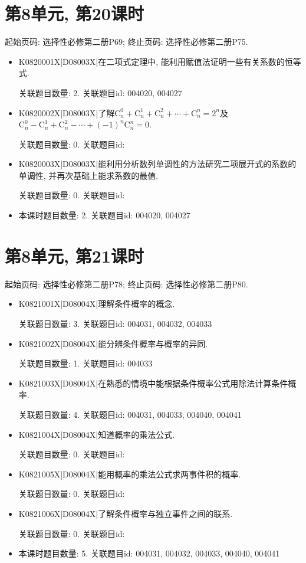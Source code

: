 \section*{第8单元, 第20课时}
起始页码: 选择性必修第二册P69; 终止页码: 选择性必修第二册P75.
\begin{itemize}
\item K0820001X|D08003X|在二项式定理中, 能利用赋值法证明一些有关系数的恒等式.

关联题目数量: 2. 关联题目id: 004020, 004027

\item K0820002X|D08003X|了解$\mathrm{C}_n^0+\mathrm{C}_n^1+\mathrm{C}_n^2+\cdots+\mathrm{C}_n^n=2^n$及$\mathrm{C}_n^0-\mathrm{C}_n^1+\mathrm{C}_n^2-\cdots+(-1)^n\mathrm{C}_n^n=0$.

关联题目数量: 0. 关联题目id: 

\item K0820003X|D08003X|能利用分析数列单调性的方法研究二项展开式的系数的单调性, 并再次基础上能求系数的最值.

关联题目数量: 0. 关联题目id: 

\item 本课时题目数量: 2. 关联题目id: 004020, 004027

\end{itemize}

\section*{第8单元, 第21课时}
起始页码: 选择性必修第二册P78; 终止页码: 选择性必修第二册P80.
\begin{itemize}
\item K0821001X|D08004X|理解条件概率的概念.

关联题目数量: 3. 关联题目id: 004031, 004032, 004033

\item K0821002X|D08004X|能分辨条件概率与概率的异同.

关联题目数量: 1. 关联题目id: 004033

\item K0821003X|D08004X|在熟悉的情境中能根据条件概率公式用除法计算条件概率.

关联题目数量: 4. 关联题目id: 004031, 004033, 004040, 004041

\item K0821004X|D08004X|知道概率的乘法公式.

关联题目数量: 0. 关联题目id: 

\item K0821005X|D08004X|能用概率的乘法公式求两事件积的概率.

关联题目数量: 0. 关联题目id: 

\item K0821006X|D08004X|了解条件概率与独立事件之间的联系.

关联题目数量: 0. 关联题目id: 

\item 本课时题目数量: 5. 关联题目id: 004031, 004032, 004033, 004040, 004041

\end{itemize}

